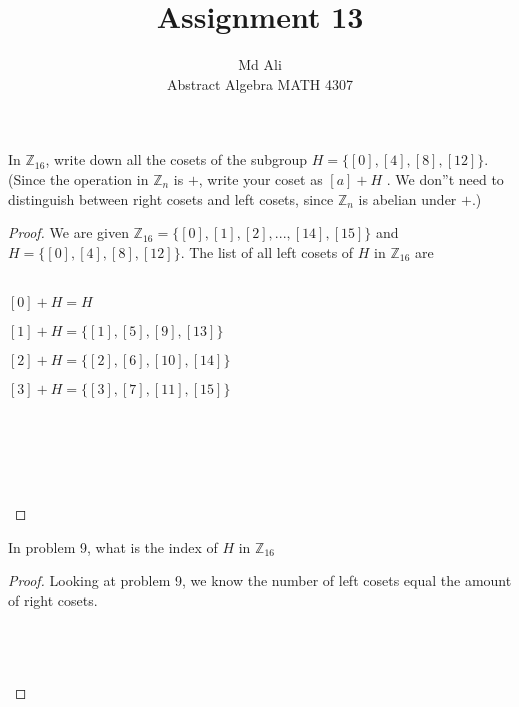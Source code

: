 \documentclass[12pt]{article}
\newenvironment{problem}[2][Problem]{\begin{trivlist}
\item[\hskip \labelsep {\bfseries #1}\hskip \labelsep {\bfseries #2.}]}{\end{trivlist}}
\begin{document}
 
 
\title{Assignment 13}%
\author{Md Ali\\ %
Abstract Algebra MATH 4307} %
 
\maketitle
 
\begin{problem}{2.4.9} %
In $\mathbb{Z}_{16}$, write down all the cosets of the subgroup $H = \{ [0], [4], [8],[12] \}$. (Since the operation in $\mathbb{Z}_n$ is $+$, write your coset as $[a]+H$ . We don''t need to distinguish between right cosets and left cosets, since $\mathbb{Z}_n$ is abelian under $+$.)
\end{problem}
 
\begin{proof}
We are given $\mathbb{Z}_{16} = \{[0],[1],[2],...,[14],[15]\}$ and $H = \{ [0], [4], [8],[12] \}$. The list of all left cosets of $H$ in $\mathbb{Z}_{16}$ are \\ \\
\centerline{$[0]+H=H$}
\centerline{$[1]+H=\{[1],[5],[9],[13]\}$}
\centerline{$[2]+H=\{[2],[6],[10],[14]\}$}
\centerline{$[3]+H=\{[3],[7],[11],[15]\}$} \\ \\
\centerline{}  \\ \\
\end{proof}

\begin{problem}{2.4.10}
In problem 9, what is the index of $H$ in $\mathbb{Z}_{16}$
\end{problem}

\begin{proof}
Looking at problem 9, we know the number of left cosets equal the amount of right cosets. \\ \\
\centerline{} \\ \\
\end{proof}
\end{document}
